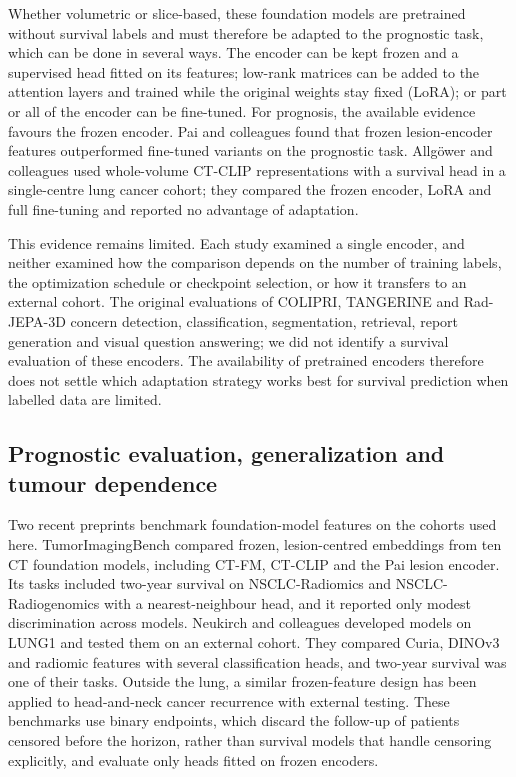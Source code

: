 Whether volumetric or slice-based, these foundation models are pretrained without survival labels and must therefore be adapted to the prognostic task, which can be done in several ways. The encoder can be kept frozen and a supervised head fitted on its features; low-rank matrices can be added to the attention layers and trained while the original weights stay fixed (LoRA);\cite{hu2021} or part or all of the encoder can be fine-tuned. For prognosis, the available evidence favours the frozen encoder. Pai and colleagues found that frozen lesion-encoder features outperformed fine-tuned variants on the prognostic task.\cite{pai2024} Allgöwer and colleagues used whole-volume CT-CLIP representations with a survival head in a single-centre lung cancer cohort; they compared the frozen encoder, LoRA and full fine-tuning and reported no advantage of adaptation.\cite{allgower2026}

This evidence remains limited. Each study examined a single encoder, and neither examined how the comparison depends on the number of training labels, the optimization schedule or checkpoint selection, or how it transfers to an external cohort. The original evaluations of COLIPRI, TANGERINE and Rad-JEPA-3D concern detection, classification, segmentation, retrieval, report generation and visual question answering; we did not identify a survival evaluation of these encoders. The availability of pretrained encoders therefore does not settle which adaptation strategy works best for survival prediction when labelled data are limited.

\subsection{Prognostic evaluation, generalization and tumour dependence}\label{sec:related-eval}
Two recent preprints benchmark foundation-model features on the cohorts used here. TumorImagingBench compared frozen, lesion-centred embeddings from ten CT foundation models, including CT-FM,\cite{pai2025ctfm} CT-CLIP and the Pai lesion encoder. Its tasks included two-year survival on NSCLC-Radiomics and NSCLC-Radiogenomics with a nearest-neighbour head, and it reported only modest discrimination across models.\cite{aerts2025tib} Neukirch and colleagues developed models on LUNG1 and tested them on an external cohort. They compared Curia, DINOv3 and radiomic features with several classification heads, and two-year survival was one of their tasks.\cite{neukirch2026} Outside the lung, a similar frozen-feature design has been applied to head-and-neck cancer recurrence with external testing.\cite{guetarni2026} These benchmarks use binary endpoints, which discard the follow-up of patients censored before the horizon, rather than survival models that handle censoring explicitly, and evaluate only heads fitted on frozen encoders.


